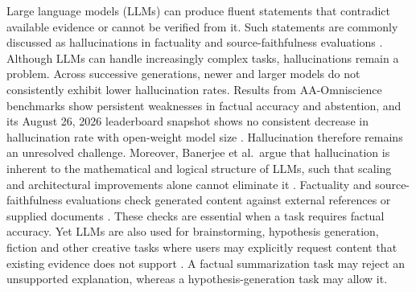 \documentclass{clv2025}
\begin{document}
Large language models (LLMs) can produce fluent statements that contradict
available evidence or cannot be verified from it. 
Such statements are commonly discussed as hallucinations in factuality and source-faithfulness evaluations \citep{ji_survey_2023,huang_survey_2025}.
Although LLMs can handle increasingly complex tasks, hallucinations remain a problem.
Across successive generations, newer and larger models do not
consistently exhibit lower hallucination rates. Results from AA-Omniscience benchmarks show
persistent weaknesses in factual accuracy and abstention, and its August 26,
2026 leaderboard snapshot shows no consistent decrease in hallucination rate
with open-weight model size
\citep{jackson_aaomniscience_2025,artificialanalysis_omniscience_leaderboard_2026}.
Hallucination therefore remains an unresolved challenge. Moreover, Banerjee
et al.\ argue that hallucination is inherent to the mathematical and logical
structure of LLMs, such that scaling and architectural improvements alone
cannot eliminate it \citep{banerjee_llms_2024}.
Factuality and source-faithfulness evaluations check generated content against external references or supplied documents \citep{maynez_faithfulness_2020,kryscinski_evaluating_2020,min_factscore_2023}.
These checks are essential when a task requires factual accuracy.
Yet LLMs are also used for brainstorming, hypothesis generation,  fiction and other creative tasks
where users may explicitly request content that existing evidence does not
support \citep{franceschelli_creativity_2024,jiang_survey_2024}.
A factual summarization task may reject an unsupported explanation, whereas a hypothesis-generation task may allow it.
\end{document}
